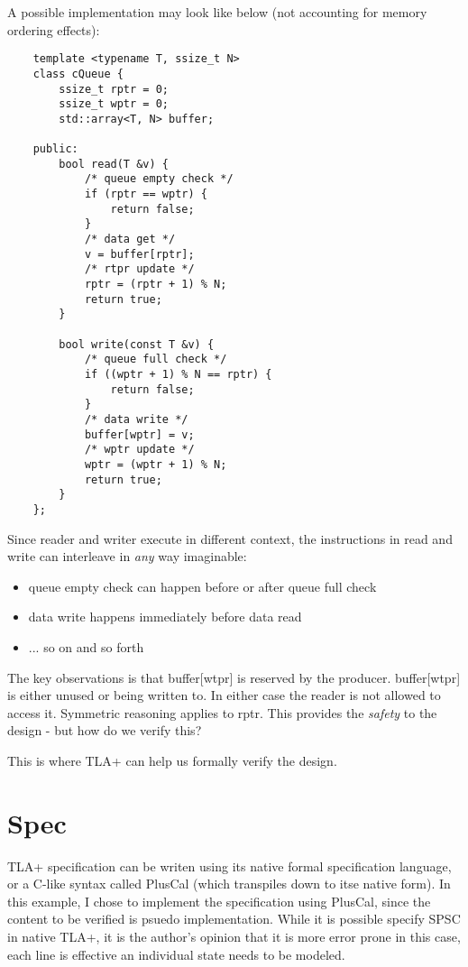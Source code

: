 \documentclass{report}
\begin{document}
A possible implementation may look like below (not accounting for memory
ordering effects):
\begin{lstlisting}
    template <typename T, ssize_t N>
    class cQueue { 
        ssize_t rptr = 0;
        ssize_t wptr = 0; 
        std::array<T, N> buffer;

    public:
        bool read(T &v) { 
            /* queue empty check */
            if (rptr == wptr) { 
                return false;
            }
            /* data get */
            v = buffer[rptr]; 
            /* rtpr update */
            rptr = (rptr + 1) % N;
            return true;
        }

        bool write(const T &v) { 
            /* queue full check */
            if ((wptr + 1) % N == rptr) { 
                return false;
            }
            /* data write */
            buffer[wptr] = v;
            /* wptr update */
            wptr = (wptr + 1) % N;
            return true;
        }
    };
\end{lstlisting}

Since reader and writer execute in different context, the instructions in read
and write can interleave in \textit{any} way imaginable:
\begin{itemize}
    \item queue empty check can happen before or after queue full check
    \item data write happens immediately before data read
    \item ... so on and so forth
\end{itemize}

The key observations is that buffer[wtpr] is reserved by the producer.
buffer[wtpr] is either unused or being written to. In either case the reader is
not allowed to access it. Symmetric reasoning applies to rptr. This provides
the \textit{safety} to the design - but how do we verify this?\newline

This is where TLA+ can help us formally verify the design.

\section{Spec}

TLA+ specification can be writen using its native formal specification
language, or a C-like syntax called PlusCal (which transpiles down to itse
native form). In this example, I chose to implement the specification using
PlusCal, since the content to be verified is psuedo implementation. While it is
possible specify SPSC in native TLA+, it is the author's opinion that it is
more error prone in this case, each line is effective an individual state needs
to be modeled.\newline
\end{document}
